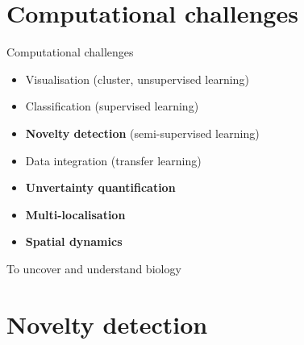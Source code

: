 \documentclass{beamer}
\theoremstyle{example}
\begin{document}

\section{Computational challenges}


\begin{frame}{Computational challenges}

  \begin{itemize}
  \item Visualisation (cluster, unsupervised learning)
  \item Classification (supervised learning)
  \item \textbf{Novelty detection} (semi-supervised learning)
  \item Data integration (transfer learning)
  \item \textbf{Unvertainty quantification}
  \item \textbf{Multi-localisation}
  \item \textbf{Spatial dynamics}
  \end{itemize}
  \centering

  \bigskip

  {\Large To uncover and understand biology}
\end{frame}



\section{Novelty detection}
\end{document}
